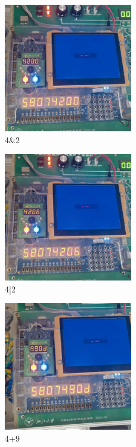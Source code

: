 \documentclass{article}
\begin{document}
    \begin{figure}[H]
    \centering
    \includegraphics[width=0.5\textwidth]{lab8/13.jpg}
    \caption{\label{Lab8}4\&2}
    \end{figure}

    \begin{figure}[H]
    \centering
    \includegraphics[width=0.5\textwidth]{lab8/14.jpg}
    \caption{\label{Lab8}4|2}
    \end{figure}

    \begin{figure}[H]
    \centering
    \includegraphics[width=0.5\textwidth]{lab8/16.jpg}
    \caption{\label{Lab8}4+9}
    \end{figure}
\end{document}
